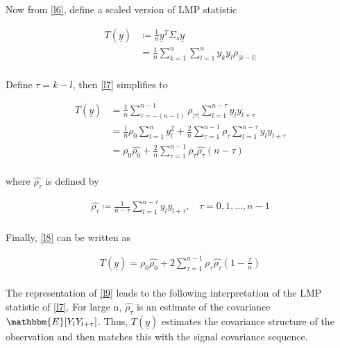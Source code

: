 \documentclass[12pt]{report}
\begin{document}
\noindent Now from \eqref{l6}, define a scaled version of LMP statistic 

\begin{equation}
\label{l7}
\begin{aligned}
T({\underline{y}}) &\coloneqq\frac{1}{n}{\underline{y}}^T\Sigma_s{\underline{y}}\\
&= \frac{1}{n}\sum\limits_{k=1}^{n}\sum\limits_{l=1}^{n}y_ky_l\rho_{|k-l|}
\end{aligned}
\end{equation}\\ 
Define $\tau = k-l$, then \eqref{l7} simplifies to
 
\begin{equation}
\label{l8}
\begin{aligned}
T({\underline{y}}) &= \frac{1}{n}\sum\limits_{\tau= -(n-1)}^{n-1}\rho_{|\tau|}\sum\limits_{l=1}^{n-\tau}y_ly_{l+\tau}\\
&= \frac{1}{n}\rho_0\sum\limits_{l=1}^{n}y^2_l + \frac{2}{n}\sum\limits_{\tau=1}^{n-1}\rho_{\tau}\sum\limits_{l=1}^{n-\tau}y_ly_{l+\tau}\\
&= \rho_0\hat{\rho_0} + \frac{2}{n}\sum\limits_{\tau=1}^{n-1}\rho_{\tau}\hat{\rho_{\tau}}(n-\tau)
\end{aligned}
\end{equation}\\
where $\hat{\rho_{\tau}}$ is defined by
 
\begin{equation}
\begin{aligned}
\hat{\rho_{\tau}} \coloneqq \frac{1}{n-\tau}\sum\limits_{l=1}^{n-\tau}y_ly_{l+\tau}, \ \ \ \ \tau = 0,1,...,n-1
\end{aligned}
\end{equation}\\ 
Finally, \eqref{l8} can be written as

\begin{equation}
\label{l9}
\begin{aligned}
T({\underline{y}}) = \rho_0\hat{\rho_0} + 2\sum\limits_{\tau=1}^{n-1}\rho_{\tau}\hat{\rho_{\tau}}\left(1-\frac{\tau}{n}\right)
\end{aligned}
\end{equation}\\
The representation of \eqref{l9} leads to the following interpretation of the LMP statistic of \eqref{l7}. For large n, $\hat{\rho_{\tau}}$ is an estimate of the covariance $\mathbbm{E}[Y_lY_{l+\tau}]$. Thus, $T({\underline{y}})$ estimates the covariance structure of the observation and then matches this with the signal covariance sequence.\\
 
\end{document}
